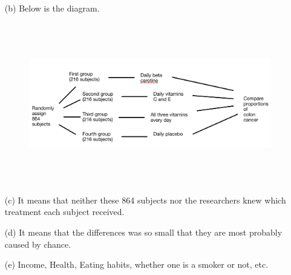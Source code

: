 \documentclass[11pt, a4paper]{article}
\begin{document}
\begin{itemize}
\begin{itemize}
\item[(b)]
Below is the diagram.
\begin{figure}[h]
    \centering
    \includegraphics[width=15cm, height=7cm]{diagram_1}
\end{figure}

\item[]

\item[(c)]
It means that neither these 864 subjects nor the researchers
knew which treatment each subject received.

\item[]

\item[(d)]
It means that the differences was so small that they are most probably caused by chance.

\item[]

\item[(e)]
Income, Health, Eating habits, whether one is a smoker or not, etc.
\end{itemize}

\end{itemize}
\end{document}
